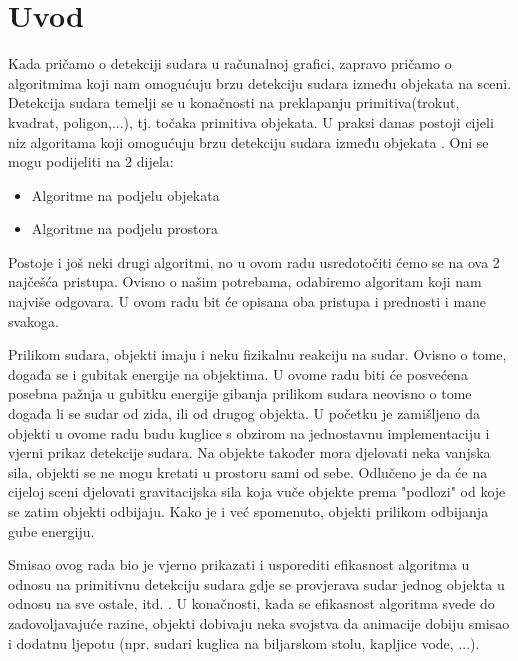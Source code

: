 \chapter{Uvod}

Kada pričamo o detekciji sudara u računalnoj grafici, zapravo pričamo o algoritmima koji nam omogućuju brzu detekciju sudara između objekata na sceni. Detekcija sudara temelji se u konačnosti na preklapanju primitiva(trokut, kvadrat, poligon,...)\cite{1}, tj. točaka primitiva objekata. U praksi danas postoji cijeli niz algoritama koji omogućuju brzu detekciju sudara između objekata \cite{1}. Oni se mogu podijeliti na 2 dijela:
\begin{itemize}
	\item Algoritme na podjelu objekata
	\item Algoritme na podjelu prostora
\end{itemize}
Postoje i još neki drugi algoritmi, no u ovom radu usredotočiti ćemo se na ova 2 najčešća pristupa. Ovisno o našim potrebama, odabiremo algoritam koji nam najviše odgovara. U ovom radu bit će opisana oba pristupa i prednosti i mane svakoga.

Prilikom sudara, objekti imaju i neku fizikalnu reakciju na sudar. Ovisno o tome, događa se i gubitak energije na objektima. U ovome radu biti će posvećena posebna pažnja u gubitku energije gibanja prilikom sudara neovisno o tome događa li se sudar od zida, ili od drugog objekta. U početku je zamišljeno da objekti u ovome radu budu kuglice s obzirom na jednostavnu implementaciju i vjerni prikaz detekcije sudara. Na objekte također mora djelovati neka vanjska sila, objekti se ne mogu kretati u prostoru sami od sebe. Odlučeno je da će na cijeloj sceni djelovati gravitacijska sila koja vuče objekte prema "podlozi" od koje se zatim objekti odbijaju. Kako je i već spomenuto, objekti prilikom odbijanja gube energiju.

Smisao ovog rada bio je vjerno prikazati i usporediti efikasnost algoritma u odnosu na primitivnu detekciju sudara gdje se provjerava sudar jednog objekta u odnosu na sve ostale, itd. . U konačnosti, kada se efikasnost algoritma svede do zadovoljavajuće razine, objekti dobivaju neka svojstva da animacije dobiju smisao i dodatnu ljepotu (npr. sudari kuglica na biljarskom stolu, kapljice vode, ...).


